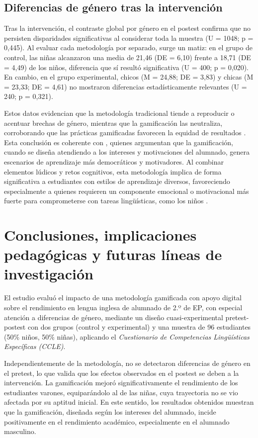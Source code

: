 \documentclass[spanish]{textolivre}
\begin{document}
\subsection{Diferencias de género tras la intervención}
Tras la intervención, el contraste global por género en el postest confirma que no persisten disparidades significativas al considerar toda la muestra (U = 1048; p = 0,445). Al evaluar cada metodología por separado, surge un matiz: en el grupo de control, las niñas alcanzaron una media de 21,46 (DE = 6,10) frente a 18,71 (DE = 4,49) de los niños, diferencia que sí resultó significativa (U = 400; p = 0,020). En cambio, en el grupo experimental, chicos (M = 24,88; DE = 3,83) y chicas (M = 23,33; DE = 4,61) no mostraron diferencias estadísticamente relevantes (U = 240; p = 0,321).

Estos datos evidencian que la metodología tradicional tiende a reproducir o acentuar brechas de género, mientras que la gamificación las neutraliza, corroborando que las prácticas gamificadas favorecen la equidad de resultados \cite{zahedi2021}. Esta conclusión es coherente con \textcite{navarro2021}, quienes argumentan que la gamificación, cuando se diseña atendiendo a los intereses y motivaciones del alumnado, genera escenarios de aprendizaje más democráticos y motivadores. Al combinar elementos lúdicos y retos cognitivos, esta metodología implica de forma significativa a estudiantes con estilos de aprendizaje diversos, favoreciendo especialmente a quienes requieren un componente emocional o motivacional más fuerte para comprometerse con tareas lingüísticas, como los niños \cite{navarro2021, williams2013}.

\section{Conclusiones, implicaciones pedagógicas y futuras líneas de investigación}
El estudio evaluó el impacto de una metodología gamificada con apoyo digital sobre el rendimiento en lengua inglesa de alumnado de 2.º de EP, con especial atención a diferencias de género, mediante un diseño cuasi-experimental pretest-postest con dos grupos (control y experimental) y una muestra de 96 estudiantes (50\% niños, 50\% niñas), aplicando el \textit{Cuestionario de Competencias Lingüísticas Específicas (CCLE)}.

Independientemente de la metodología, no se detectaron diferencias de género en el pretest, lo que valida que los efectos observados en el postest se deben a la intervención. La gamificación mejoró significativamente el rendimiento de los estudiantes varones, equiparándolo al de las niñas, cuya trayectoria no se vio afectada por su aptitud inicial. En este sentido, los resultados obtenidos muestran que la gamificación, diseñada según los intereses del alumnado, incide positivamente en el rendimiento académico, especialmente en el alumnado masculino.
\end{document}
